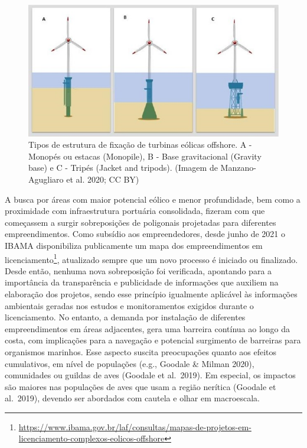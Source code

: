\documentclass[
  oneside]{scrbook}
\DeclareRobustCommand{\href}[2]{#2\footnote{\url{#1}}}
\begin{document}
\begin{figure}[H]

{\centering \includegraphics[width=0.85\linewidth]{imagens/cap08/Figura_8.5} 

}

\caption{Tipos de estrutura de fixação de turbinas eólicas offshore. A - Monopés ou estacas (Monopile), B - Base gravitacional (Gravity base) e C - Tripés (Jacket and tripods). (Imagem de Manzano-Agugliaro et al. 2020; CC BY)}\label{fig:65}
\end{figure}

A busca por áreas com maior potencial eólico e menor profundidade, bem como a proximidade com infraestrutura portuária consolidada, fizeram com que começassem a surgir sobreposições de poligonais projetadas para diferentes empreendimentos. Como subsídio aos empreendedores, desde junho de 2021 o IBAMA disponibiliza publicamente um \href{https://www.ibama.gov.br/laf/consultas/mapas-de-projetos-em-licenciamento-complexos-eolicos-offshore}{mapa dos empreendimentos em licenciamento}, atualizado sempre que um novo processo é iniciado ou finalizado. Desde então, nenhuma nova sobreposição foi verificada, apontando para a importância da transparência e publicidade de informações que auxiliem na elaboração dos projetos, sendo esse princípio igualmente aplicável às informações ambientais geradas nos estudos e monitoramentos exigidos durante o licenciamento. No entanto, a demanda por instalação de diferentes empreendimentos em áreas adjacentes, gera uma barreira contínua ao longo da costa, com implicações para a navegação e potencial surgimento de barreiras para organismos marinhos. Esse aspecto suscita preocupações quanto aos efeitos cumulativos, em nível de populações (e.g., Goodale \& Milman 2020), comunidades ou guildas de aves (Goodale et al.~2019). Em especial, os impactos são maiores nas populações de aves que usam a região nerítica (Goodale et al.~2019), devendo ser abordados com cautela e olhar em macroescala.
\end{document}
